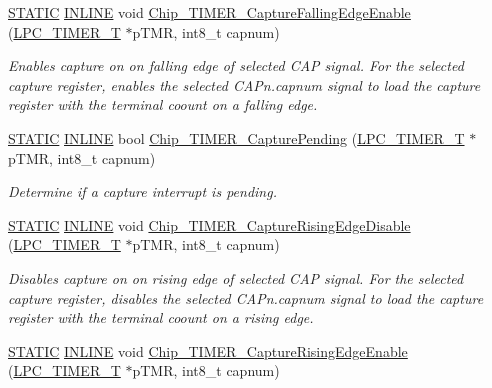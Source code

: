 \begin{DoxyCompactItemize}
\hyperlink{group__LPC__Types__Public__Macros_ga10b2d890d871e1489bb02b7e70d9bdfb}{S\+T\+A\+T\+IC} \hyperlink{group__LPC__Types__Public__Types_ga2eb6f9e0395b47b8d5e3eeae4fe0c116}{I\+N\+L\+I\+NE} void \hyperlink{group__TIMER__17XX__40XX_ga9938c5dc5cf1aa81064cf2e14ab29d44}{Chip\+\_\+\+T\+I\+M\+E\+R\+\_\+\+Capture\+Falling\+Edge\+Enable} (\hyperlink{structLPC__TIMER__T}{L\+P\+C\+\_\+\+T\+I\+M\+E\+R\+\_\+T} $\ast$p\+T\+MR, int8\+\_\+t capnum)
\begin{DoxyCompactList}\small\item\em Enables capture on on falling edge of selected C\+AP signal. For the selected capture register, enables the selected C\+A\+Pn.\+capnum signal to load the capture register with the terminal coount on a falling edge. \end{DoxyCompactList}\item 
\hyperlink{group__LPC__Types__Public__Macros_ga10b2d890d871e1489bb02b7e70d9bdfb}{S\+T\+A\+T\+IC} \hyperlink{group__LPC__Types__Public__Types_ga2eb6f9e0395b47b8d5e3eeae4fe0c116}{I\+N\+L\+I\+NE} bool \hyperlink{group__TIMER__17XX__40XX_gae9a2575f38b3acaf6255caf15c5b65df}{Chip\+\_\+\+T\+I\+M\+E\+R\+\_\+\+Capture\+Pending} (\hyperlink{structLPC__TIMER__T}{L\+P\+C\+\_\+\+T\+I\+M\+E\+R\+\_\+T} $\ast$p\+T\+MR, int8\+\_\+t capnum)
\begin{DoxyCompactList}\small\item\em Determine if a capture interrupt is pending. \end{DoxyCompactList}\item 
\hyperlink{group__LPC__Types__Public__Macros_ga10b2d890d871e1489bb02b7e70d9bdfb}{S\+T\+A\+T\+IC} \hyperlink{group__LPC__Types__Public__Types_ga2eb6f9e0395b47b8d5e3eeae4fe0c116}{I\+N\+L\+I\+NE} void \hyperlink{group__TIMER__17XX__40XX_ga25bcfd101f052ee941da5bae28d84fcd}{Chip\+\_\+\+T\+I\+M\+E\+R\+\_\+\+Capture\+Rising\+Edge\+Disable} (\hyperlink{structLPC__TIMER__T}{L\+P\+C\+\_\+\+T\+I\+M\+E\+R\+\_\+T} $\ast$p\+T\+MR, int8\+\_\+t capnum)
\begin{DoxyCompactList}\small\item\em Disables capture on on rising edge of selected C\+AP signal. For the selected capture register, disables the selected C\+A\+Pn.\+capnum signal to load the capture register with the terminal coount on a rising edge. \end{DoxyCompactList}\item 
\hyperlink{group__LPC__Types__Public__Macros_ga10b2d890d871e1489bb02b7e70d9bdfb}{S\+T\+A\+T\+IC} \hyperlink{group__LPC__Types__Public__Types_ga2eb6f9e0395b47b8d5e3eeae4fe0c116}{I\+N\+L\+I\+NE} void \hyperlink{group__TIMER__17XX__40XX_ga7768003112560a8cbd06582fa8747fae}{Chip\+\_\+\+T\+I\+M\+E\+R\+\_\+\+Capture\+Rising\+Edge\+Enable} (\hyperlink{structLPC__TIMER__T}{L\+P\+C\+\_\+\+T\+I\+M\+E\+R\+\_\+T} $\ast$p\+T\+MR, int8\+\_\+t capnum)

\end{DoxyCompactItemize}
